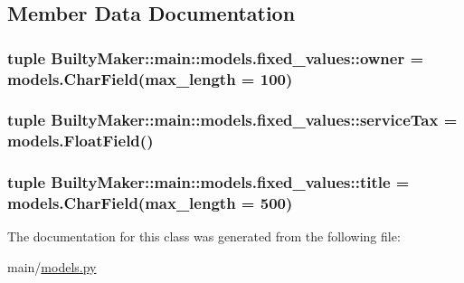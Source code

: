 \subsection{\-Member \-Data \-Documentation}
\hypertarget{classBuiltyMaker_1_1main_1_1models_1_1fixed__values_af1599b91b0c6285ab5f5fd3bcd3fc98f}{
\subsubsection[{owner}]{\setlength{\rightskip}{0pt plus 5cm}tuple {\bf \-Builty\-Maker\-::main\-::models.\-fixed\-\_\-values\-::owner} = models.\-Char\-Field(max\-\_\-length = 100)}}\label{classBuiltyMaker_1_1main_1_1models_1_1fixed__values_af1599b91b0c6285ab5f5fd3bcd3fc98f}
\hypertarget{classBuiltyMaker_1_1main_1_1models_1_1fixed__values_a63d688b696cd1f58a0f9559b8c7610e4}{
\subsubsection[{service\-Tax}]{\setlength{\rightskip}{0pt plus 5cm}tuple {\bf \-Builty\-Maker\-::main\-::models.\-fixed\-\_\-values\-::service\-Tax} = models.\-Float\-Field()}}\label{classBuiltyMaker_1_1main_1_1models_1_1fixed__values_a63d688b696cd1f58a0f9559b8c7610e4}
\hypertarget{classBuiltyMaker_1_1main_1_1models_1_1fixed__values_ab16de8741c77253e9b5cc51653610369}{
\subsubsection[{title}]{\setlength{\rightskip}{0pt plus 5cm}tuple {\bf \-Builty\-Maker\-::main\-::models.\-fixed\-\_\-values\-::title} = models.\-Char\-Field(max\-\_\-length = 500)}}\label{classBuiltyMaker_1_1main_1_1models_1_1fixed__values_ab16de8741c77253e9b5cc51653610369}


\-The documentation for this class was generated from the following file\-:\begin{DoxyCompactItemize}
\item 
main/\hyperlink{models_8py}{models.\-py}\end{DoxyCompactItemize}

